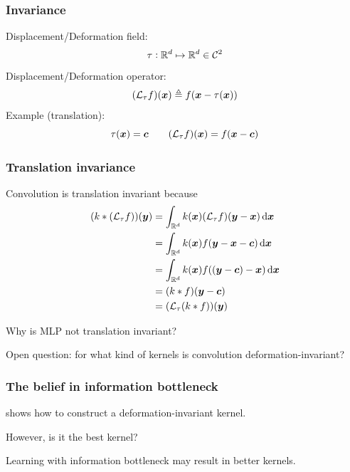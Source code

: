 \documentclass{beamer}
\begin{document}
\begin{frame}

\frametitle{Invariance}

Displacement/Deformation field:
\[
\tau: {\mathbb R}^d \mapsto {\mathbb R}^d \in {\mathcal C}^2
\]
Displacement/Deformation operator:
\[
({\mathcal L}_\tau f) ({\bm x}) \triangleq f({\bm x} - \tau ({\bm x}))
\]
Example (translation):
\[
\tau ({\bm x}) = {\bm c} \qquad
({\mathcal L}_\tau f) ({\bm x}) = f({\bm x} - {\bm c})
\]

\end{frame}

\begin{frame}

\frametitle{Translation invariance}

Convolution is translation invariant because
\begin{align*}
(k * (\call_\tau f)) (\bmy)
& = \int_{\bbr^d} k(\bmx) (\call_\tau f) (\bmy - \bmx) \dif \bmx \\
& = \int_{\bbr^d} k(\bmx) f(\bmy - \bmx - \bmc) \dif \bmx \\
& = \int_{\bbr^d} k(\bmx) f((\bmy - \bmc) - \bmx) \dif \bmx \\
& = (k * f) (\bmy - \bmc) \\
& = (\call_\tau (k * f)) (\bmy)
\end{align*}

Why is MLP not translation invariant?

Open question: for what kind of kernels is convolution deformation-invariant?

\end{frame}

\begin{frame}

\frametitle{The belief in information bottleneck}

\cite{mallat2012group} shows how to construct a deformation-invariant kernel.

However, is it the best kernel?

Learning with information bottleneck may result in better kernels.

\end{frame}

\begin{frame}[allowframebreaks]




\end{frame}
\end{document}

